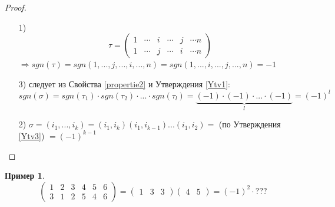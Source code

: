 \documentclass[a4paper, 12pt]{article}
\newcommand\tab[1][.5cm]{\hspace*{#1}}
\theoremstyle{definition}
\newtheorem*{example1}{Пример}
\begin{document}
  \begin{proof}\tab
    \begin{itemize}
      \item[1)] $$\tau = \begin{pmatrix}
        1 & \cdots & i & \cdots & j & \cdots n \\
        1 & \cdots & j & \cdots & i & \cdots n
      \end{pmatrix} $$$  \Longrightarrow sgn (\tau) = sgn(1,...,j,...,i,...,n) = sgn(1,...,i,...,j,...,n) = -1$  
      \item[3)] следует из Свойства \eqref{propertie2} и Утверждения \eqref{Ytv1}:
      $$sgn(\sigma) = sgn(\tau_1) \cdot sgn(\tau_2) \cdot ... \cdot sgn(\tau_l) = \underbrace{(-1)\cdot(-1)\cdot ... \cdot(-1)}_{l} = (-1)^{l}$$ 
      \item[2)] $\sigma = (i_1,...,i_k) = (i_1,i_k)(i_1,i_{k-1})...(i_1,i_2) =$ (по Утверждения \eqref{Ytv3}) $= (-1)^{k-1}$ 
    \end{itemize}
  \end{proof}
  \begin{example1}
    $$\begin{pmatrix}
      1 & 2 & 3 & 4 & 5 & 6 \\
      3 & 1 & 2 & 5 & 4 & 6
    \end{pmatrix} = \begin{pmatrix}
      1 & 3 & 3
    \end{pmatrix} \begin{pmatrix}
      4 & 5 
    \end{pmatrix} = (-1)^2 \cdot ???$$
  \end{example1}
\end{document}
